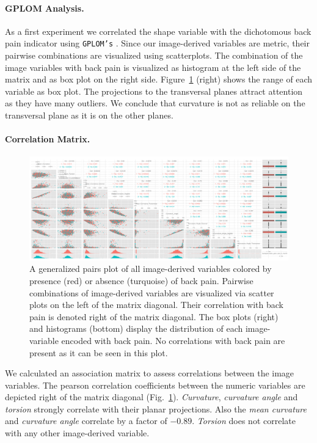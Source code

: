 \documentclass[a4paper,twoside]{style/article}
\begin{document}
\paragraph{GPLOM Analysis.}
As a first experiment we correlated the shape variable with the dichotomous back pain indicator using \texttt{GPLOM's} \cite{GPLOMS}.
Since our image-derived variables are metric, their pairwise combinations are visualized using scatterplots.
The combination of the image variables with back pain is visualized as histogram at the left side of the matrix and as box plot on the right side.
Figure~\ref{fig:image-parameter-range} (right) shows the range of each variable as box plot.
The projections to the transversal planes attract attention as they have many outliers.
We conclude that curvature is not as reliable on the transversal plane as it is on the other planes.
\paragraph{Correlation Matrix.}
\begin{figure}[htb]
  \centering
  \includegraphics[width=1.0\textwidth]{figures/image-parameter-range}
  \caption{%
A generalized pairs plot of all image-derived variables colored by presence (red) or absence (turquoise) of back pain.
Pairwise combinations of image-derived variables are visualized via scatter plots on the left of the matrix diagonal.
Their correlation with back pain is denoted right of the matrix diagonal.
The box plots (right) and histograms (bottom) display the distribution of each image-variable encoded with back pain.
No correlations with back pain are present as it can be seen in this plot.
}
  \label{fig:image-parameter-range}
\end{figure}
We calculated an association matrix to assess correlations between the image variables.
The pearson correlation coefficients between the numeric variables are depicted right of the matrix diagonal (Fig.~\ref{fig:image-parameter-range}).
\emph{Curvature}, \emph{curvature angle} and \emph{torsion} strongly correlate with their planar projections.
Also the \emph{mean curvature} and \emph{curvature angle} correlate by a factor of $-0.89$.
\emph{Torsion} does not correlate with any other image-derived variable.
\end{document}
